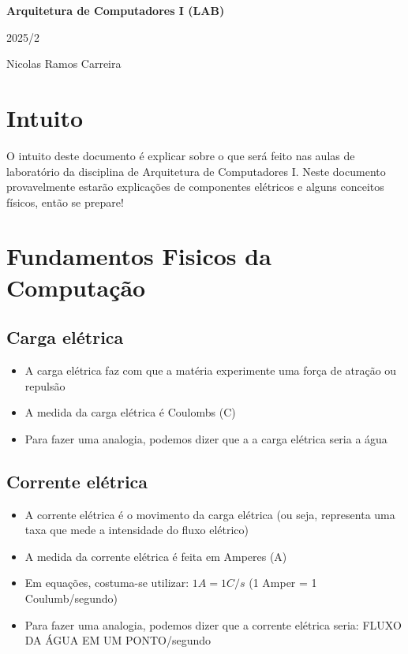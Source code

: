 \documentclass{report}
\begin{document}
	
	\begin{titlepage}
	\centering
	\vspace*{5cm} %
	
	{\Huge\bfseries Arquitetura de Computadores I (LAB)\par} %
	
	\vspace{0.5cm}
	{\Large 2025/2\par} %
	
	\vfill
	{\large Nicolas Ramos Carreira\par} %
	
	\vspace*{2cm}
	\end{titlepage}
	
	\tableofcontents
	\newpage
	
	\chapter{Intuito}
	O intuito deste documento é explicar sobre o que será feito nas aulas de laboratório da disciplina de Arquitetura de Computadores I. Neste documento provavelmente estarão explicações de componentes elétricos e alguns conceitos físicos, então se prepare!
	\chapter{Fundamentos Fisicos da Computação}
	\section{Carga elétrica}
	\begin{itemize}
		\item A carga elétrica faz com que a matéria experimente uma força de atração ou repulsão
		\item A medida da carga elétrica é Coulombs (C)
		\item Para fazer uma analogia, podemos dizer que a a carga elétrica seria a água
	\end{itemize}
	\section{Corrente elétrica}
	\begin{itemize}
		\item A corrente elétrica é o movimento da carga elétrica (ou seja, representa uma taxa que mede a intensidade do fluxo elétrico)
		\item A medida da corrente elétrica é feita em Amperes (A)
		\item Em equações, costuma-se utilizar: $1A = 1 C/s$ (1 Amper = 1 Coulumb/segundo)
		\item Para fazer uma analogia, podemos dizer que a corrente elétrica seria: FLUXO DA ÁGUA EM UM PONTO/segundo
	\end{itemize}
\end{document}
